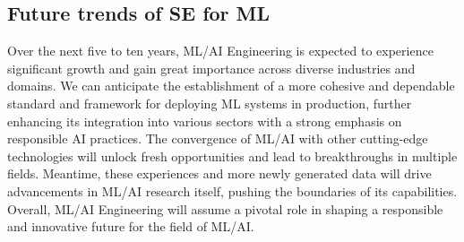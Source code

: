\documentclass[11pt]{article}
\begin{document}
\subsection*{ Future trends of SE for ML }
Over the next five to ten years, ML/AI Engineering is expected to experience significant growth and gain great importance across diverse industries and domains. We can anticipate the establishment of a more cohesive and dependable standard and framework for deploying ML systems in production, further enhancing its integration into various sectors with a strong emphasis on responsible AI practices. The convergence of ML/AI with other cutting-edge technologies will unlock fresh opportunities and lead to breakthroughs in multiple fields. Meantime, these experiences and more newly generated data will drive advancements in ML/AI research itself, pushing the boundaries of its capabilities. Overall, ML/AI Engineering will assume a pivotal role in shaping a responsible and innovative future for the field of ML/AI.

\newpage
\printbibliography
\end{document}
